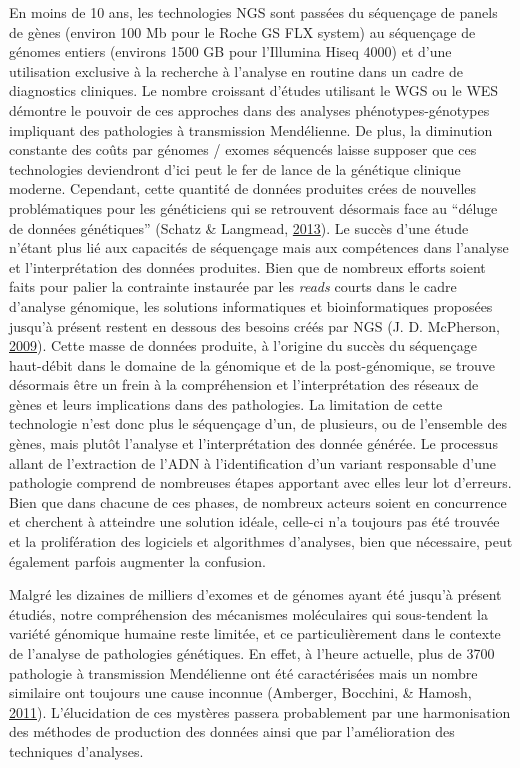 \documentclass[12pt,twoside]{reedthesis}
\theoremstyle{definition}
\theoremstyle{definition}
\theoremstyle{remark}
\begin{document}
  En moins de 10 ans, les technologies NGS sont passées du séquençage de
  panels de gènes (environ 100 Mb pour le Roche GS FLX system) au
  séquençage de génomes entiers (environs 1500 GB pour l'Illumina Hiseq
  4000) et d'une utilisation exclusive à la recherche à l'analyse en
  routine dans un cadre de diagnostics cliniques. Le nombre croissant
  d'études utilisant le WGS ou le WES démontre le pouvoir de ces approches
  dans des analyses phénotypes-génotypes impliquant des pathologies à
  transmission Mendélienne. De plus, la diminution constante des coûts par
  génomes / exomes séquencés laisse supposer que ces technologies
  deviendront d'ici peut le fer de lance de la génétique clinique moderne.
  Cependant, cette quantité de données produites crées de nouvelles
  problématiques pour les généticiens qui se retrouvent désormais face au
  ``déluge de données génétiques'' (Schatz \& Langmead,
  \protect\hyperlink{ref-Schatz2013}{2013}). Le succès d'une étude n'étant
  plus lié aux capacités de séquençage mais aux compétences dans l'analyse
  et l'interprétation des données produites. Bien que de nombreux efforts
  soient faits pour palier la contrainte instaurée par les \emph{reads}
  courts dans le cadre d'analyse génomique, les solutions informatiques et
  bioinformatiques proposées jusqu'à présent restent en dessous des
  besoins créés par NGS (J. D. McPherson,
  \protect\hyperlink{ref-McPherson2009}{2009}). Cette masse de données
  produite, à l'origine du succès du séquençage haut-débit dans le domaine
  de la génomique et de la post-génomique, se trouve désormais être un
  frein à la compréhension et l'interprétation des réseaux de gènes et
  leurs implications dans des pathologies. La limitation de cette
  technologie n'est donc plus le séquençage d'un, de plusieurs, ou de
  l'ensemble des gènes, mais plutôt l'analyse et l'interprétation des
  donnée générée. Le processus allant de l'extraction de l'ADN à
  l'identification d'un variant responsable d'une pathologie comprend de
  nombreuses étapes apportant avec elles leur lot d'erreurs. Bien que dans
  chacune de ces phases, de nombreux acteurs soient en concurrence et
  cherchent à atteindre une solution idéale, celle-ci n'a toujours pas été
  trouvée et la prolifération des logiciels et algorithmes d'analyses,
  bien que nécessaire, peut également parfois augmenter la confusion.
  
  Malgré les dizaines de milliers d'exomes et de génomes ayant été jusqu'à
  présent étudiés, notre compréhension des mécanismes moléculaires qui
  sous-tendent la variété génomique humaine reste limitée, et ce
  particulièrement dans le contexte de l'analyse de pathologies
  génétiques. En effet, à l'heure actuelle, plus de 3700 pathologie à
  transmission Mendélienne ont été caractérisées mais un nombre similaire
  ont toujours une cause inconnue (Amberger, Bocchini, \& Hamosh,
  \protect\hyperlink{ref-Amberger2011}{2011}). L'élucidation de ces
  mystères passera probablement par une harmonisation des méthodes de
  production des données ainsi que par l'amélioration des techniques
  d'analyses.
  
\end{document}
